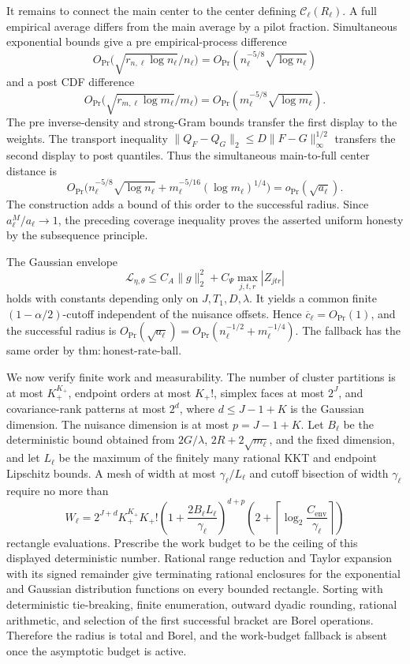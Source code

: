 It remains to connect the main center to the center defining \(\mathcal C_\ell(R_\ell)\).  A full empirical average differs from the main average by a pilot fraction.  Simultaneous exponential bounds give a pre empirical-process difference
\[
 O_{\Pr}\bigl(\sqrt{r_{n,\ell}\log n_\ell}/n_\ell\bigr)
 =O_{\Pr}(n_\ell^{-5/8}\sqrt{\log n_\ell})
\]
and a post CDF difference
\[
 O_{\Pr}\bigl(\sqrt{r_{m,\ell}\log m_\ell}/m_\ell\bigr)
 =O_{\Pr}(m_\ell^{-5/8}\sqrt{\log m_\ell}).
\]
The pre inverse-density and strong-Gram bounds transfer the first display to the weights.  The transport inequality
\(\|Q_F-Q_G\|_2\leq D\|F-G\|_\infty^{1/2}\) transfers the second display to post quantiles.  Thus the simultaneous main-to-full center distance is
\[
 O_{\Pr}\bigl(n_\ell^{-5/8}\sqrt{\log n_\ell}
       +m_\ell^{-5/16}(\log m_\ell)^{1/4}\bigr)
 =o_{\Pr}(\sqrt{a_\ell}).
\]
The construction adds a bound of this order to the successful radius.  Since
\(a^M_\ell/a_\ell\to1\), the preceding coverage inequality proves the asserted uniform honesty by the subsequence principle.

The Gaussian envelope
\[
 \mathcal L_{\eta,\theta}
 \leq C_A\|g\|_2^2+C_\Psi\max_{j,t,r}|Z_{jtr}|
\]
holds with constants depending only on \(J,T_1,D,\lambda\).  It yields a common finite \((1-\alpha/2)\)-cutoff independent of the nuisance offsets.  Hence \(\overline c_\ell=O_{\Pr}(1)\), and the successful radius is
\(O_{\Pr}(\sqrt{a_\ell})
=O_{\Pr}(n_\ell^{-1/2}+m_\ell^{-1/4})\).  The fallback has the same order by \(\mathrm{thm:honest\mbox{-}rate\mbox{-}ball}\).

We now verify finite work and measurability.  The number of cluster partitions is at most \(K_+^{K_+}\), endpoint orders at most \(K_+!\), simplex faces at most \(2^J\), and covariance-rank patterns at most \(2^d\), where \(d\leq J-1+K\) is the Gaussian dimension.  The nuisance dimension is at most \(p=J-1+K\).  Let \(B_\ell\) be the deterministic bound obtained from \(2G/\lambda\), \(2R+2\sqrt{m_\ell}\), and the fixed dimension, and let \(L_\ell\) be the maximum of the finitely many rational KKT and endpoint Lipschitz bounds.  A mesh of width at most \(\gamma_\ell/L_\ell\) and cutoff bisection of width \(\gamma_\ell\) require no more than
\[
 W_\ell=
 2^{J+d}K_+^{K_+} K_+!
 \left(1+\frac{2B_\ell L_\ell}{\gamma_\ell}\right)^{d+p}
 \left(2+\left\lceil\log_2\frac{C_{\mathrm{env}}}{\gamma_\ell}\right\rceil\right)
\]
rectangle evaluations.  Prescribe the work budget to be the ceiling of this displayed deterministic number.  Rational range reduction and Taylor expansion with its signed remainder give terminating rational enclosures for the exponential and Gaussian distribution functions on every bounded rectangle.  Sorting with deterministic tie-breaking, finite enumeration, outward dyadic rounding, rational arithmetic, and selection of the first successful bracket are Borel operations.  Therefore the radius is total and Borel, and the work-budget fallback is absent once the asymptotic budget is active.

